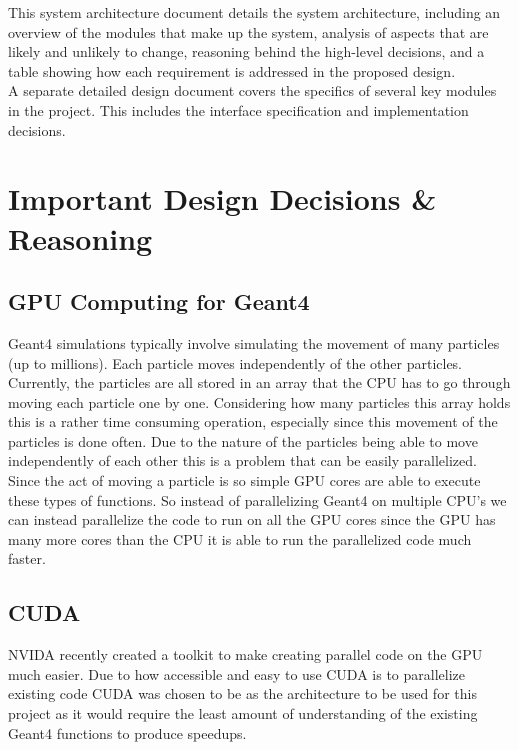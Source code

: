 \documentclass[12pt]{article}
\begin{document}
This system architecture document details the system architecture, including an overview of the modules that make up the system, analysis of aspects that are likely and unlikely to change, reasoning behind the high-level decisions, and a table showing how each requirement is addressed in the proposed design.\\

A separate detailed design document covers the specifics of several key modules in the project. This includes the interface specification and implementation decisions.

\section{Important Design Decisions \& Reasoning}
\subsection{GPU Computing for Geant4}
Geant4 simulations typically involve simulating the movement of many particles (up to millions). Each particle moves independently of the other particles. Currently, the particles are all stored in an array that the CPU has to go through moving each particle one by one. Considering how many particles this array holds this is a rather time consuming operation, especially since this movement of the particles is done often. 
Due to the nature of the particles being able to move independently of each other this is a problem that can be easily parallelized. Since the act of moving a particle is so simple GPU cores are able to execute these types of functions. So instead of parallelizing Geant4 on multiple CPU's we can instead parallelize the code to run on all the GPU cores since the GPU has many more cores than the CPU it is able to run the parallelized code much faster.

\subsection{CUDA}
NVIDA recently created a toolkit to make creating parallel code on the GPU much easier. Due to how accessible and easy to use CUDA is to parallelize existing code CUDA was chosen to be as the architecture to be used for this project as it would require the least amount of understanding of the existing Geant4 functions to produce speedups. 
\end{document}
